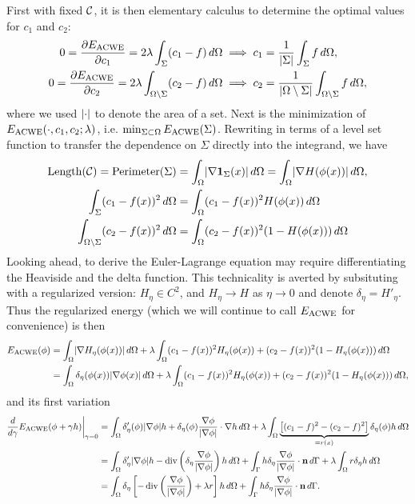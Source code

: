 First with fixed $\mathcal{C}$, it is then elementary calculus to determine the optimal values for $c_1$ and $c_2$: 
\begin{align}
0 = \frac{\partial E_\textrm{ACWE}}{\partial c_1}  = 2\lambda \int_{\Sigma} (c_1 - f ) \,d\Omega
&\implies 
c_1 = \frac{1}{\lvert\Sigma\rvert} \int_{\Sigma} f \,d\Omega,
\label{eq:c1}
\\
0 = \frac{\partial E_\textrm{ACWE}}{\partial c_2}  = 2\lambda \int_{\Omega\setminus \Sigma} (c_2 - f )\,d\Omega
&\implies 
c_2 = \frac{1}{\lvert\Omega\setminus\Sigma\rvert} \int_{\Omega\setminus \Sigma} f \,d\Omega,
\label{eq:c2}
\end{align}
where we used $\lvert\cdot\rvert$ to denote the area of a set. Next is the minimization of $E_\textrm{ACWE}(\cdot, c_1, c_2; \lambda)$, i.e. $\min_{\Sigma \subset \Omega} E_\textrm{ACWE}(\Sigma)$. Rewriting in terms of a level set function to transfer the dependence on $\Sigma$ directly into the integrand, we have 
\begin{align}
\textrm{Length}(\mathcal{C}) 
= \textrm{Perimeter}(\Sigma) 
&= \int_{\Omega} \lvert\nabla \mathbf{1}_\Sigma(x)\rvert \,d\Omega
= \int_{\Omega} \lvert \nabla H(\phi(x)) \rvert \,d\Omega,
\label{eacwe1}
\\
\int_{\Sigma} (c_1 - f(x) )^2 \, d\Omega 
&= \int_{\Omega} (c_1 - f(x))^2 H(\phi(x)) \, d\Omega
\\
\int_{\Omega\setminus\Sigma} (c_2 - f(x))^2 \,d\Omega 
&=
\int_{\Omega} (c_2 - f(x))^2 (1 - H(\phi(x))) \,d\Omega
\end{align}
Looking ahead, to derive the Euler-Lagrange equation may require differentiating the Heaviside and the delta function. This technicality is averted by subsituting with a regularized version: $H_\eta \in C^2$, and $H_\eta \rightarrow H$ as $\eta\rightarrow 0$ and denote $\delta_\eta = H'_\eta$. Thus the regularized energy (which we will continue to call $E_\textrm{ACWE}$ for convenience) is then 
\begin{align*}
E_\textrm{ACWE}(\phi) 
&= \int_{\Omega } \lvert\nabla H_\eta(\phi(x))\rvert \,d\Omega 
+ \lambda\int_{\Omega} (c_1 - f(x))^2 H_\eta(\phi(x)) 
+ (c_2 - f(x))^2 (1 - H_\eta(\phi(x))) \,d\Omega
\\
&= \int_{\Omega } \delta_\eta(\phi(x)) \lvert\nabla \phi(x)\rvert \,d\Omega 
+ \lambda\int_{\Omega} (c_1 - f(x))^2 H_\eta(\phi(x)) 
+ (c_2 - f(x))^2 (1 - H_\eta(\phi(x))) \,d\Omega,
\end{align*}
and its first variation
\begin{align*}
\frac{d}{d\gamma}E_\textrm{ACWE}(\phi + \gamma h) \bigg\rvert_{\gamma = 0}
&= \int_{\Omega} \delta'_\eta(\phi) \lvert\nabla \phi\rvert h + \delta_\eta(\phi) \frac{\nabla \phi}{\lvert\nabla \phi\rvert} \cdot \nabla h \,d\Omega
+ \lambda\int_{\Omega} \underbrace{\left[(c_1 - f)^2 - (c_2 - f)^2 \right]}_{=r(x)} \delta_\eta(\phi) h \,d\Omega 
\\
&= \int_{\Omega } \delta'_\eta \lvert\nabla \phi\rvert h
- \operatorname{div}\left(\delta_\eta\frac{\nabla \phi}{\lvert\nabla \phi\rvert}  \right)  h
\,d\Omega 
+ \int_\Gamma h\delta_\eta\frac{\nabla \phi}{\lvert\nabla \phi\rvert} \cdot \mathbf{n} \,d\Gamma 
+ \lambda\int_{\Omega} r \delta_\eta h \,d\Omega
\\
&= \int_{\Omega} \delta_\eta\left[ 
- \operatorname{div}\left(\frac{\nabla \phi}{\lvert\nabla \phi\rvert} \right) + \lambda r
\right] h\,d\Omega 
+ \int_\Gamma h\delta_\eta\frac{\nabla \phi}{\lvert\nabla \phi\rvert} \cdot \mathbf{n} \,d\Gamma. 
\end{align*}
